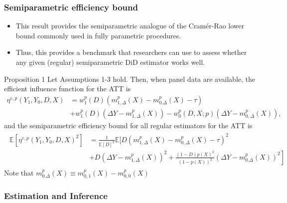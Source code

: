 \documentclass{beamer}
\begin{document}
\begin{frame}\frametitle{Semiparametric efficiency bound}
    \footnotesize
    \begin{itemize}
        \item This result provides the semiparametric analogue of the Cram\'{e}r-Rao lower bound commonly used in fully parametric procedures.
        \item Thus, this provides a benchmark that researchers can use to assess whether any given (regular) semiparametric DiD estimator works well.
    \end{itemize}
    \normalsize
    \begin{block}{Proposition 1}
        \footnotesize
        Let Assumptions 1-3 hold. Then, when panel data are available, the efficient influence function for the ATT is 
        \normalsize
        \footnotesize
        \begin{align*}
            \eta^{e,p}(Y_{1}, Y_{0}, D, X) &= w^{p}_{1}(D)(m^{p}_{1, \Delta}(X) - m^{p}_{0. \Delta}(X) - \tau) \\
            & + w^{p}_{1}(D)(\Delta Y - m^{p}_{1, \Delta}(X)) - w^{p}_{0}(D,X;p)(\Delta Y - m^{p}_{0, \Delta}(X)),
        \end{align*}
        \normalsize
        \footnotesize
        and the semiparametric efficiency bound for all regular estimators for the ATT is 
        \normalsize
        \footnotesize
        \begin{align*}
            \begin{split}
                \mathbb{E}[\eta^{e,p}(Y_{1}, Y_{0}, D, X)^{2}] &= \frac{1}{\mathbb{E}[D]^{2}}\mathbb{E} \biggr[ D(m^{p}_{1, \Delta}(X) - m^{p}_{0,\Delta}(X) - \tau)^{2} 
                \\&+ \left. D(\Delta Y - m^{p}_{1, \Delta}(X))^{2} + \frac{(1-D)p(X)^{2}}{(1-p(X))^{2}}(\Delta Y - m^{p}_{0. \Delta}(X))^{2} \right]
            \end{split}
        \end{align*}
        Note that $m^{p}_{0.\Delta}(X) \equiv m^{p}_{0,1}(X) - m^{p}_{0,0}(X)$
        \normalsize
    \end{block}
\end{frame}


\begin{frame}\frametitle{Estimation and Inference}

\end{frame}
\end{document}
